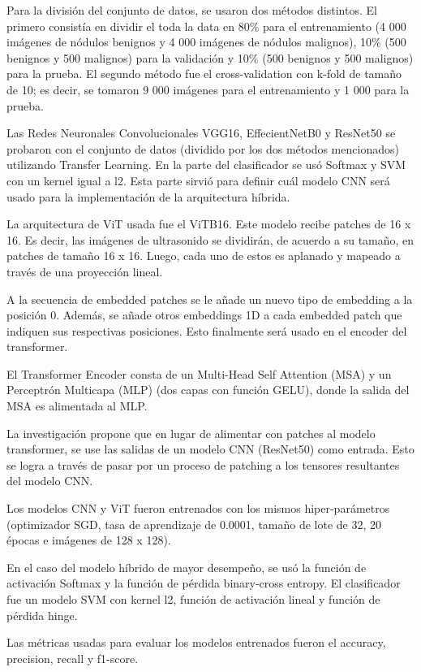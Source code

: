 Para la división del conjunto de datos, se usaron dos métodos distintos. El primero consistía en dividir el toda la data en 80\% para el entrenamiento (4 000 imágenes de nódulos benignos y 4 000 imágenes de nódulos malignos), 10\% (500 benignos y 500 malignos) para la validación y 10\% (500 benignos y 500 malignos) para la prueba. El segundo método fue el cross-validation con k-fold de tamaño de 10; es decir, se tomaron 9 000 imágenes para el entrenamiento y 1 000 para la prueba.

Las Redes Neuronales Convolucionales VGG16, EffecientNetB0 y ResNet50 se probaron con el conjunto de datos (dividido por los dos métodos mencionados) utilizando Transfer Learning. En la parte del clasificador se usó Softmax y SVM con un kernel igual a l2. Esta parte sirvió para definir cuál modelo CNN será usado para la implementación de la arquitectura híbrida.

La arquitectura de ViT usada fue el ViTB16. Este modelo recibe patches de 16 x 16. Es decir, las imágenes de ultrasonido se dividirán, de acuerdo a su tamaño, en patches de tamaño 16 x 16. Luego, cada uno de estos es aplanado y mapeado a través de una proyección lineal.

A la secuencia de embedded patches se le añade un nuevo tipo de embedding a la posición 0. Además, se añade otros embeddings 1D a cada embedded patch que indiquen sus respectivas posiciones. Esto finalmente será usado en el encoder del transformer.

El Transformer Encoder consta de un Multi-Head Self Attention (MSA) y un Perceptrón Multicapa (MLP) (dos capas con función GELU), donde la salida del MSA es alimentada al MLP.

La investigación propone que en lugar de alimentar con patches al modelo transformer, se use las salidas de un modelo CNN (ResNet50) como entrada. Esto se logra a través de pasar por un proceso de patching a los tensores resultantes del modelo CNN.

Los modelos CNN y ViT fueron entrenados con los mismos hiper-parámetros (optimizador SGD, tasa de aprendizaje de 0.0001, tamaño de lote de 32, 20 épocas e imágenes de 128 x 128).

En el caso del modelo híbrido de mayor desempeño, se usó la función de activación Softmax y la función de pérdida binary-cross entropy. El clasificador fue un modelo SVM con kernel l2, función de activación lineal y función de pérdida hinge.

Las métricas usadas para evaluar los modelos entrenados fueron el accuracy, precision, recall y f1-score.

